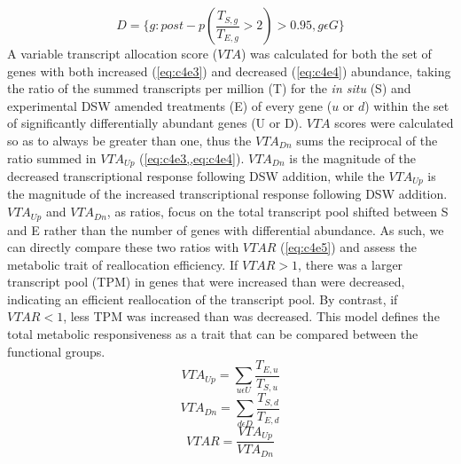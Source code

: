 \begin{equation}
	\label{eq:c4e2}
	 D = \{g : post-p(\frac{T_{S,g}}{T_{E,g}} > 2) > 0.95, g \epsilon G\}
\end{equation}
A variable transcript allocation score ($VTA$) was calculated for both the set of genes with both increased (\cref{eq:c4e3}) and decreased (\cref{eq:c4e4}) abundance, taking the ratio of the summed transcripts per million (T) for the \textit{in situ} (S) and experimental DSW amended treatments (E) of every gene ($u$ or $d$) within the set of significantly differentially abundant genes (U or D). $VTA$ scores were calculated so as to always be greater than one, thus the $VTA_{Dn}$ sums the reciprocal of the ratio summed in $VTA_{Up}$ (\cref{eq:c4e3,,eq:c4e4}). $VTA_{Dn}$ is the magnitude of the decreased transcriptional response following DSW addition, while the $VTA_{Up}$ is the magnitude of the increased transcriptional response following DSW addition. $VTA_{Up}$ and $VTA_{Dn}$, as ratios, focus on the total transcript pool shifted between S and E rather than the number of genes with differential abundance. As such, we can directly compare these two ratios with $VTAR$ (\cref{eq:c4e5}) and assess the metabolic trait of reallocation efficiency. If $VTAR > 1$, there was a larger transcript pool (TPM) in genes that were increased than were decreased, indicating an efficient reallocation of the transcript pool. By contrast, if $VTAR < 1$, less TPM was increased than was decreased. This model defines the total metabolic responsiveness as a trait that can be compared between the functional groups. 
\begin{equation}
	\label{eq:c4e3}
	VTA_{Up} = \sum_{u\epsilon U} \frac{T_{E,u}}{T_{S,u}}
\end{equation}
\begin{equation}
	\label{eq:c4e4}
	VTA_{Dn} = \sum_{d\epsilon D} \frac{T_{S,d}}{T_{E,d}}
\end{equation}
\begin{equation}
	\label{eq:c4e5}
	VTAR = \frac{VTA_{Up}}{VTA_{Dn}}
\end{equation}

